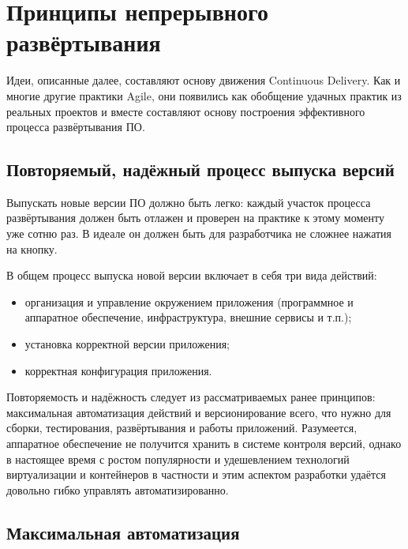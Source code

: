 \documentclass{../../text-style}
\begin{document}
\section{Принципы непрерывного развёртывания}

Идеи, описанные далее, составляют основу движения Continuous Delivery. Как и многие другие практики Agile, они появились как обобщение удачных практик из реальных проектов и вместе составляют основу построения эффективного процесса развёртывания ПО.

\subsection{Повторяемый, надёжный процесс выпуска версий}

Выпускать новые версии ПО должно быть легко: каждый участок процесса развёртывания должен быть отлажен и проверен на практике к этому моменту уже сотню раз. В идеале он должен быть для разработчика не сложнее нажатия на кнопку.

В общем процесс выпуска новой версии включает в себя три вида действий:

\begin{itemize}
    \item организация и управление окружением приложения (программное и аппаратное обеспечение, инфраструктура, внешние сервисы и т.п.);
    \item установка корректной версии приложения;
    \item корректная конфигурация приложения.
\end{itemize}

Повторяемость и надёжность следует из рассматриваемых ранее принципов: максимальная автоматизация действий и версионирование всего, что нужно для сборки, тестирования, развёртывания и работы приложений. Разумеется, аппаратное обеспечение не получится хранить в системе контроля версий, однако в настоящее время с ростом популярности и удешевлением технологий виртуализации и контейнеров в частности и этим аспектом разработки удаётся довольно гибко управлять автоматизированно.

\subsection{Максимальная автоматизация}
\end{document}
